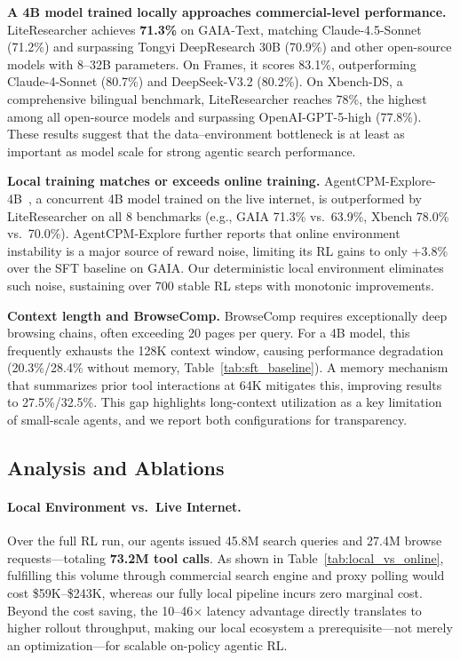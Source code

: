 \documentclass{article} %
\theoremstyle{plain}
\theoremstyle{definition}
\theoremstyle{remark}
\begin{document}
\textbf{A 4B model trained locally approaches commercial-level performance.} LiteResearcher achieves \textbf{71.3\%} on GAIA-Text, matching Claude-4.5-Sonnet (71.2\%) and surpassing Tongyi DeepResearch 30B (70.9\%) and other open-source models with 8--32B parameters. On Frames, it scores 83.1\%, outperforming Claude-4-Sonnet (80.7\%) and DeepSeek-V3.2 (80.2\%). On Xbench-DS, a comprehensive bilingual benchmark, LiteResearcher reaches 78\%, the highest among all open-source models and surpassing OpenAI-GPT-5-high (77.8\%). These results suggest that the data--environment bottleneck is at least as important as model scale for strong agentic search performance.

\textbf{Local training matches or exceeds online training.} AgentCPM-Explore-4B~\citep{chen2026agentcpm}, a concurrent 4B model trained on the live internet, is outperformed by LiteResearcher on all 8 benchmarks (e.g., GAIA 71.3\% vs.\ 63.9\%, Xbench 78.0\% vs.\ 70.0\%). AgentCPM-Explore further reports that online environment instability is a major source of reward noise, limiting its RL gains to only +3.8\% over the SFT baseline on GAIA. Our deterministic local environment eliminates such noise, sustaining over 700 stable RL steps with monotonic improvements.

\textbf{Context length and BrowseComp.} BrowseComp requires exceptionally deep browsing chains, often exceeding 20 pages per query. For a 4B model, this frequently exhausts the 128K context window, causing performance degradation (20.3\%/28.4\% without memory, Table~\ref{tab:sft_baseline}). A memory mechanism that summarizes prior tool interactions at 64K mitigates this, improving results to 27.5\%/32.5\%. This gap highlights long-context utilization as a key limitation of small-scale agents, and we report both configurations for transparency.

\subsection{Analysis and Ablations}

\paragraph{Local Environment vs.\ Live Internet.}
Over the full RL run, our agents issued 45.8M search queries and 27.4M browse requests---totaling \textbf{73.2M tool calls}. As shown in Table~\ref{tab:local_vs_online}, fulfilling this volume through commercial search engine and proxy polling would cost \$59K--\$243K, whereas our fully local pipeline incurs zero marginal cost. Beyond the cost saving, the 10--46$\times$ latency advantage directly translates to higher rollout throughput, making our local ecosystem a prerequisite---not merely an optimization---for scalable on-policy agentic RL.
\end{document}
